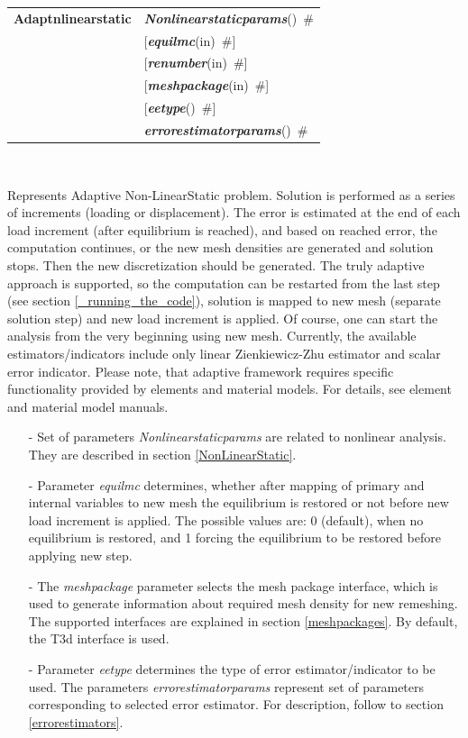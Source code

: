 \documentclass[a4paper]{article}
\makeatletter
\newcommand{\param}[1]{{\em #1}}
\newcommand{\keywordnotype}[1]{\mbox{{\it{\bf{#1}}}}}
\newcommand{\keyword}[2]{\mbox{{\keywordnotype{#1}\tiny (#2)}}}
\newcommand{\entKeywordInst}[1]{\mbox{{\bf{{#1}}}}}
\newcommand{\field}[2]{\mbox{\keyword{#1}{#2}~\#}}
\newcommand{\optField}[2]{\mbox{[\field{#1}{#2}]}}
\newenvironment{record}[1][]{\begin{tabular}{|ll}}{\end{tabular}\\}
\newcommand{\recentry}[2]{{#1}&{#2}\\}
\newcounter{rcc}
\newenvironment{record}[1][\textwidth]{\setcounter{rcc}{0}\begin{tabular*}{#1}{|ll@{\extracolsep{\fill}}r}}{\end{tabular*}\\}
\newcommand{\recentry}[2]{\ifthenelse{\value{rcc}>0}{&$\backslash$ \\}{\setcounter{rcc}{1}}{#1}&{#2}}
\makeatother
\begin{document}
\begin{record}
\recentry{\entKeywordInst{Adaptnlinearstatic}}{\field{Nonlinearstaticparams}{}}
\recentry{}{\optField{equilmc}{in}} \recentry{}{\optField{renumber}{in}} \recentry{}{\optField{meshpackage}{in}}
\recentry{}{\optField{eetype}{}} \recentry{}{\field{errorestimatorparams}{}}
\end{record}

Represents Adaptive Non-LinearStatic problem. Solution is performed  as a series of increments (loading or displacement).
The error is estimated at the end of each load increment (after
equilibrium is reached), and based on reached error, the computation
continues, or the new mesh densities are generated and solution
stops. Then the new discretization should be generated.
The truly adaptive approach is supported, so the computation can be
restarted from the last step (see section \ref{_running_the_code}), solution is mapped to new mesh (separate
solution step) and new load increment is applied. Of course, one can start the analysis from
the very beginning using new mesh. Currently, the available
estimators/indicators include only linear
Zienkiewicz-Zhu estimator and scalar error indicator. Please note, that adaptive framework requires
specific functionality provided by elements and material models. For
details, see element and material model manuals.
\begin{itemize}
\item[-]
Set of parameters \param{Nonlinearstaticparams} are related to
nonlinear analysis. They are described in section
\ref{NonLinearStatic}.
\item[-]
Parameter \param{equilmc} determines, whether after mapping of primary
and internal variables to new mesh the equilibrium is restored or not
before new load increment is applied. The possible values are: 0
(default), when no equilibrium is restored, and 1 forcing the
equilibrium to be restored before applying new step.
\item[-]
The \param{meshpackage} parameter selects the mesh package interface,
which is used to generate information about required mesh density for
new remeshing. The supported interfaces are explained in section
\ref{meshpackages}. By default, the T3d interface is used.
\item[-]
Parameter \param{eetype} determines the type of error
estimator/indicator to be used. The parameters
\param{errorestimatorparams} represent set of parameters corresponding
to selected error estimator. For description, follow to section
\ref{errorestimators}.
\end{itemize}
%
\end{document}
